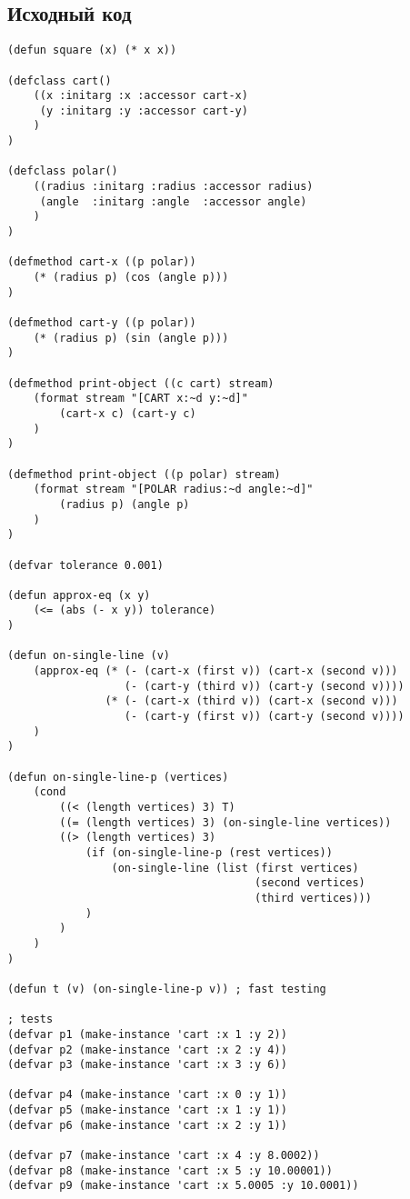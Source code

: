 \documentclass[a4paper, 12pt]{article}
\begin{document}
\subsection{Исходный код}
\begin{lstlisting}
(defun square (x) (* x x))

(defclass cart()
    ((x :initarg :x :accessor cart-x)
     (y :initarg :y :accessor cart-y)
    )
)

(defclass polar()
    ((radius :initarg :radius :accessor radius)
     (angle  :initarg :angle  :accessor angle)
    )
)

(defmethod cart-x ((p polar))
    (* (radius p) (cos (angle p)))
)

(defmethod cart-y ((p polar))
    (* (radius p) (sin (angle p)))
)

(defmethod print-object ((c cart) stream)
    (format stream "[CART x:~d y:~d]"
        (cart-x c) (cart-y c)
    )
)

(defmethod print-object ((p polar) stream)
    (format stream "[POLAR radius:~d angle:~d]"
        (radius p) (angle p)
    )
)

(defvar tolerance 0.001)

(defun approx-eq (x y)
    (<= (abs (- x y)) tolerance)
)

(defun on-single-line (v)
    (approx-eq (* (- (cart-x (first v)) (cart-x (second v)))
                  (- (cart-y (third v)) (cart-y (second v))))
               (* (- (cart-x (third v)) (cart-x (second v)))
                  (- (cart-y (first v)) (cart-y (second v))))
    )
)

(defun on-single-line-p (vertices)
    (cond
        ((< (length vertices) 3) T)
        ((= (length vertices) 3) (on-single-line vertices))
        ((> (length vertices) 3)
            (if (on-single-line-p (rest vertices))
                (on-single-line (list (first vertices)
                                      (second vertices)
                                      (third vertices)))
            )
        )
    )
)

(defun t (v) (on-single-line-p v)) ; fast testing

; tests
(defvar p1 (make-instance 'cart :x 1 :y 2))
(defvar p2 (make-instance 'cart :x 2 :y 4))
(defvar p3 (make-instance 'cart :x 3 :y 6))

(defvar p4 (make-instance 'cart :x 0 :y 1))
(defvar p5 (make-instance 'cart :x 1 :y 1))
(defvar p6 (make-instance 'cart :x 2 :y 1))

(defvar p7 (make-instance 'cart :x 4 :y 8.0002))
(defvar p8 (make-instance 'cart :x 5 :y 10.00001))
(defvar p9 (make-instance 'cart :x 5.0005 :y 10.0001))


\end{lstlisting}
\end{document}
